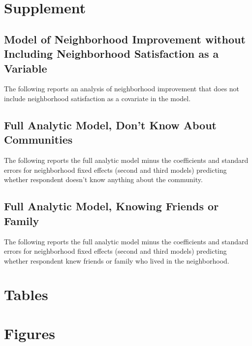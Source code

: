 \documentclass[]{article}
\theoremstyle{definition}
\theoremstyle{definition}
\theoremstyle{definition}
\theoremstyle{remark}
\begin{document}
\section{Supplement}\label{supplement}

\subsection{Model of Neighborhood Improvement without Including
Neighborhood Satisfaction as a
Variable}\label{model-of-neighborhood-improvement-without-including-neighborhood-satisfaction-as-a-variable}

The following reports an analysis of neighborhood improvement that does
not include neighborhood satisfaction as a covariate in the model.

\subsection{Full Analytic Model, Don't Know About
Communities}\label{full-analytic-model-dont-know-about-communities}

The following reports the full analytic model minus the coefficients and
standard errors for neighborhood fixed effects (second and third models)
predicting whether respondent doesn't know anything about the community.

\subsection{Full Analytic Model, Knowing Friends or
Family}\label{full-analytic-model-knowing-friends-or-family}

The following reports the full analytic model minus the coefficients and
standard errors for neighborhood fixed effects (second and third models)
predicting whether respondent knew friends or family who lived in the
neighborhood.

\clearpage
\section{Tables}\label{sec:tables}










\clearpage
\section{Figures}
\label{sec:figures}
\end{document}
